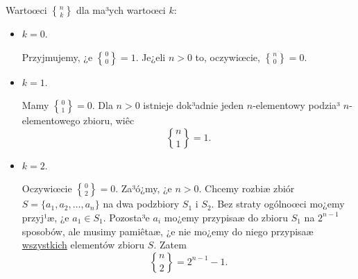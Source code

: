 \documentclass[a4paper,10pt]{beamer}
\begin{document}
\begin{frame}

Wartoœci $\displaystyle{n\brace k}$ dla ma³ych wartoœci $k$:
\begin{itemize}
\item $k=0$.

Przyjmujemy, ¿e $\displaystyle{0\brace0}=1$. Je¿eli $n>0$ to, oczywiœcie, $\displaystyle{n\brace0}=0$.

\item $k=1$.

Mamy $\displaystyle{0\brace1}=0$. Dla $n>0$ istnieje dok³adnie jeden $n$-elementowy podzia³ $n$-elementowego zbioru, wiêc $$\displaystyle{n\brace1}=1.$$

\item $k=2$.

Oczywiœcie $\displaystyle{0\brace2}=0$. Za³ó¿my, ¿e $n>0$. Chcemy rozbiæ zbiór $S=\{a_1,a_2,\ldots,a_n\}$ na dwa podzbiory $S_1$ i $S_2$. Bez straty ogólnoœci mo¿emy przyj¹æ, ¿e $a_1\in S_1$. Pozosta³e $a_i$ mo¿emy przypisaæ do zbioru $S_1$ na $2^{n-1}$ sposobów, ale musimy pamiêtaæ, ¿e nie mo¿emy do niego przypisaæ \underline{wszystkich} elementów zbioru $S$. Zatem
$${n\brace2}=2^{n-1}-1.$$
\end{itemize}

\end{frame}
\end{document}
